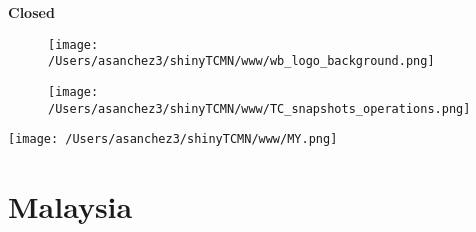 \documentclass{article}\usepackage[]{graphicx}\usepackage[]{color}
\begin{document}
\begin{minipage}[b]{0.99\textwidth}
  \raggedright{\color{white!30!blue} \textbf{\large Closed}}
  \vspace*{0.3cm}
  
{\footnotesize
{}
}

  \vspace*{0.2cm}
\end{minipage}

\newpage
\begin{figure}
  \vspace{-3ex} %
  \hspace{-7ex} %
  \texttt{[image: /Users/asanchez3/shinyTCMN/www/wb\_logo\_background.png]}
\end{figure}
\begin{figure}
  \begin{minipage}[t]{0.99\textwidth} %
      \vspace{-30ex}
      \hspace{-2ex}
      \raggedright{\texttt{[image: /Users/asanchez3/shinyTCMN/www/TC\_snapshots\_operations.png]}}
  \end{minipage}
\end{figure}
%
\begin{minipage}[t]{0.99\textwidth} %
  \vspace{-1.5cm}
  \begin{minipage}[c]{0.36\textwidth} 
    \begin{minipage}[c]{0.28\textwidth} %
      \texttt{[image: /Users/asanchez3/shinyTCMN/www/MY.png]}
    \end{minipage}
    \begin{minipage}[c]{0.70\textwidth} %
      \section*{\color{blue!40!black}Malaysia}
    \end{minipage}
  \end{minipage}
  \begin{minipage}[c]{0.63\textwidth}
  \end{minipage}  
\end{minipage} %
\end{document}
